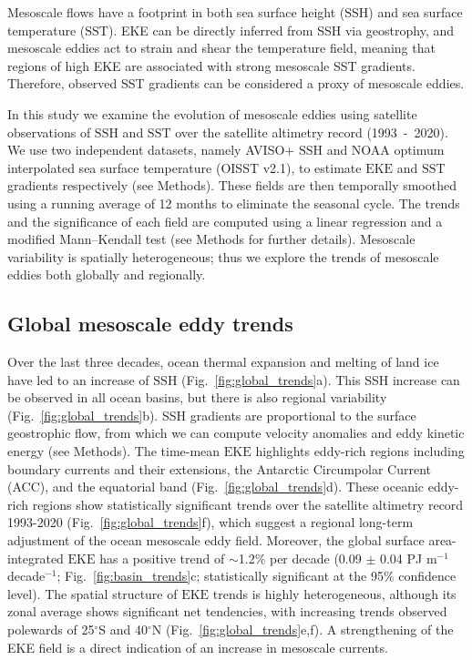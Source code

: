 \documentclass{nature}
\newcommand{\EKE}{\text{EKE}}
\newcommand{\SST}{\text{SST}}
\newcommand{\SSH}{\text{SSH}}
\begin{document}
Mesoscale flows have a footprint in both sea surface height ($\SSH$) and sea surface temperature ($\SST$). EKE can be directly inferred from SSH via geostrophy, and mesoscale eddies act to strain and shear the temperature field, meaning that regions of high EKE are associated with strong mesoscale SST gradients. Therefore, observed SST gradients can be considered a proxy of mesoscale eddies\cite{Yuan_eddy_induced_2017,Castellani_SST_identif_2006,Holladay_mesoscale_1975}.

In this study we examine the evolution of mesoscale eddies using satellite observations of $\SSH$ and $\SST$ over the satellite altimetry record (1993~-~2020). We use two independent datasets, namely AVISO+ $\SSH$ and NOAA optimum interpolated sea surface temperature (OISST v2.1)\cite{Banzon_OISST_2020}, to estimate $\EKE$ and $\SST$ gradients respectively (see Methods). These fields are then temporally smoothed using a running average of 12 months to eliminate the seasonal cycle. The trends and the significance of each field are computed using a linear regression and a modified Mann--Kendall test\cite{Sheng_MK_2004} (see Methods for further details). Mesoscale variability is spatially heterogeneous; thus we explore the trends of mesoscale eddies both globally and regionally.

\subsection{Global mesoscale eddy trends}\mbox{}\vspace{-1.5em}

Over the last three decades, ocean thermal expansion and melting of land ice have led to an increase of $\SSH$\cite{IPCC_2019_ocean,Polito_SST_trends_2008} (Fig.~\ref{fig:global_trends}a). This SSH increase can be observed in all ocean basins, but there is also regional variability (Fig.~\ref{fig:global_trends}b). SSH gradients are proportional to the surface geostrophic flow, from which we can compute velocity anomalies and eddy kinetic energy (see Methods). The time-mean $\EKE$ highlights eddy-rich regions including boundary currents and their extensions, the Antarctic Circumpolar Current (ACC), and the equatorial band (Fig.~\ref{fig:global_trends}d). These oceanic eddy-rich regions show statistically significant trends over the satellite altimetry record 1993-2020 (Fig.~\ref{fig:global_trends}f), which suggest a regional long-term adjustment of the ocean mesoscale eddy field. Moreover, the global surface area-integrated $\EKE$ has a positive trend of $\sim$1.2\% per decade (0.09 $\pm$ 0.04 PJ m$^{-1}$ decade$^{-1}$; Fig.~\ref{fig:basin_trends}c; statistically significant at the 95\% confidence level). The spatial structure of $\EKE$ trends is highly heterogeneous, although its zonal average shows significant net tendencies, with increasing trends observed polewards of 25$^\circ$S and 40$^\circ$N (Fig.~\ref{fig:global_trends}e,f). A strengthening of the EKE field is a direct indication of an increase in mesoscale currents.
\end{document}
